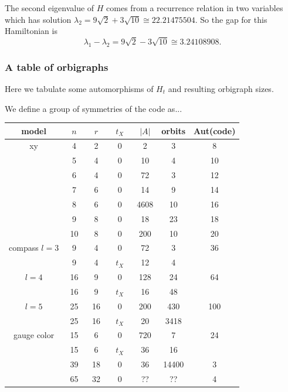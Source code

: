 The second eigenvalue of $H$ comes from a recurrence
relation in two variables which has solution
$\lambda_2 = 9\sqrt{2} + 3\sqrt{10} \cong 22.21475504.$
So the gap for this Hamiltonian  is 
$$\lambda_1 - \lambda_2 = 9\sqrt{2} - 3\sqrt{10} \cong 3.24108908.$$



%
\subsubsection{A table of orbigraphs}

Here we tabulate some automorphisms of $H_t$
and resulting orbigraph sizes.

We define a group of symmetries of the code as...

\begin{center}
\begin{tabular}{ c|c|c|c|c|c|c } 
model &\ $n$\ &\ $r$\ &\ $t_X$\ & $|A|$ & orbits & Aut(code) \\
\hline
    xy & 4 &  2& 0 & 2 & 3 & 8 \\
       & 5 &  4& 0 & 10 & 4 & 10 \\
       & 6 &  4& 0 & 72 & 3 & 12 \\
       & 7 &  6& 0 & 14 & 9 & 14 \\
       & 8 &  6& 0 & 4608 & 10 & 16 \\
       & 9 &  8& 0 & 18 & 23 & 18  \\
       & 10 & 8& 0 & 200 & 10 & 20  \\
\hline
    compass $l=3$ & 9 & 4 & 0 & 72 & 3 & 36 \\
                  & 9 & 4 & $t_X$ & 12 & 4 &  \\
            $l=4$  & 16 & 9  & 0 & 128 & 24 & 64 \\
                   & 16 & 9  & $t_X$ & 16 & 48 &  \\
            $l=5$  & 25 & 16 & 0 & 200 & 430 & 100 \\
                   & 25 & 16 & $t_X$ & 20  & 3418 &  \\
\hline
    gauge color & 15 & 6  & 0 & 720 & 7 & 24  \\
                & 15 & 6  & $t_X$ & 36 & 16 &  \\
                & 39 & 18 & 0 & 36 & 14400 & 3  \\
                & 65 & 32 & 0 & ?? & ?? & 4 \\
\end{tabular}
\end{center}

